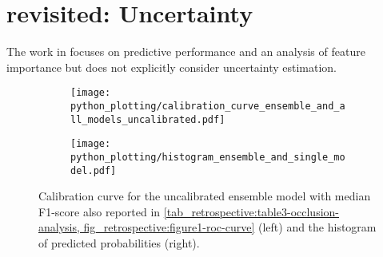 \section{ revisited: Uncertainty}
The work in \textcite{wenstrup_retrospective_2023} focuses on predictive performance and an analysis of feature importance but does not explicitly consider uncertainty estimation. 




\begin{figure}
    \begin{subfigure}[c]{0.48\columnwidth}
        \centering
        \texttt{[image: python\_plotting/calibration\_curve\_ensemble\_and\_all\_models\_uncalibrated.pdf]}
    \end{subfigure}
    \begin{subfigure}[c]{0.48\columnwidth}
        \centering
        \texttt{[image: python\_plotting/histogram\_ensemble\_and\_single\_model.pdf]}
    \end{subfigure}
    \caption[Calibration curve for the uncalibrated stroke recognition model and empirical distribution of predicted probabilities.]{Calibration curve for the uncalibrated ensemble model with median F1-score also reported in \cref{tab_retrospective:table3-occlusion-analysis, fig_retrospective:figure1-roc-curve} (left) and the histogram of predicted probabilities (right).}
\end{figure}









